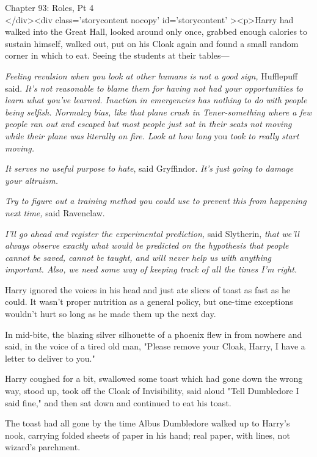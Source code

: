 
Chapter 93: Roles, Pt 4\\
</div><div  class='storycontent nocopy' id='storycontent' ><p>Harry had walked 
into the Great Hall, looked around only once, grabbed enough calories to 
sustain himself, walked out, put on his Cloak again and found a small random 
corner in which to eat. Seeing the students at their tables---

\emph{Feeling revulsion when you look at other humans is not a good sign,} 
Hufflepuff said. \emph{It's not reasonable to blame them for having not had 
your opportunities to learn what you've learned. Inaction in emergencies has 
nothing to do with people being selfish. Normalcy bias, like that plane crash 
in Tener-something where a few people ran out and escaped but most people just 
sat in their seats not moving while their plane was literally on fire. Look at 
how long} you\emph{ took to really start moving.}

\emph{It serves no useful purpose to hate}, said Gryffindor. \emph{It's just 
going to damage your altruism.}

\emph{Try to figure out a training method you could use to prevent this from 
happening next time,} said Ravenclaw.

\emph{I'll go ahead and register the experimental prediction,} said Slytherin, 
\emph{that we'll always observe exactly what would be predicted on the 
hypothesis that people cannot be saved, cannot be taught, and will never help 
us with anything important. Also, we need some way of keeping track of all the 
times I'm right.}

Harry ignored the voices in his head and just ate slices of toast as fast as he 
could. It wasn't proper nutrition as a general policy, but one-time exceptions 
wouldn't hurt so long as he made them up the next day.

In mid-bite, the blazing silver silhouette of a phoenix flew in from nowhere 
and said, in the voice of a tired old man, "Please remove your Cloak, Harry, I 
have a letter to deliver to you."

Harry coughed for a bit, swallowed some toast which had gone down the wrong 
way, stood up, took off the Cloak of Invisibility, said aloud "Tell Dumbledore 
I said fine," and then sat down and continued to eat his toast.

The toast had all gone by the time Albus Dumbledore walked up to Harry's nook, 
carrying folded sheets of paper in his hand; real paper, with lines, not 
wizard's parchment.


